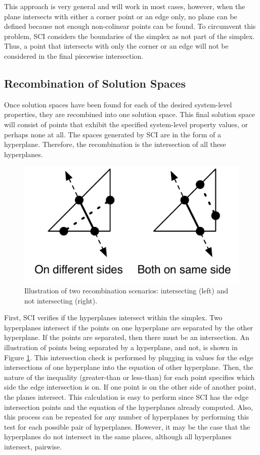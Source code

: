This approach is very general and will work in most cases, however, when the plane intersects with either a corner point or an edge only, no plane can be defined because not enough non-colinear points can be found.
To circumvent this problem, SCI considers the boundaries of the simplex as not part of the simplex.
Thus, a point that intersects with only the corner or an edge will not be considered in the final piecewise intersection.

\subsection{Recombination of Solution Spaces}

Once solution spaces have been found for each of the desired system-level properties, they are recombined into one solution space.
This final solution space will consist of points that exhibit the specified system-level property values, or perhaps none at all.
The spaces generated by SCI are in the form of a hyperplane.
Therefore, the recombination is the intersection of all these hyperplanes.


\begin{figure}[ht]
\centering
\includegraphics[scale=1]{images/intcheck.pdf}
\caption{Illustration of two recombination scenarios: intersecting (left) and not intersecting (right).}
\label{fig:intcheck}
\end{figure}


First, SCI verifies if the hyperplanes intersect within the simplex.
Two hyperplanes intersect if the points on one hyperplane are separated by the other hyperplane.
If the points are separated, then there must be an intersection.
An illustration of points being separated by a hyperplane, and not, is shown in Figure \ref{fig:intcheck}.
This intersection check is performed by plugging in values for the edge intersections of one hyperplane into the equation of other hyperplane.
Then, the nature of the inequality (greater-than or less-than) for each point specifies which side the edge intersection is on.
If one point is on the other side of another point, the planes intersect.
This calculation is easy to perform since SCI has the edge intersection points and the equation of the hyperplanes already computed.
Also, this process can be repeated for any number of hyperplanes by performing this test for each possible pair of hyperplanes.
However, it may be the case that the hyperplanes do not intersect in the same places, although all hyperplanes intersect, pairwise.


